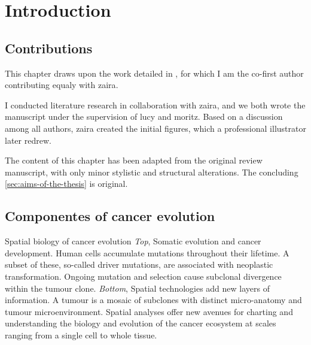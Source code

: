 \chapter{Introduction}
\label{sec:chapter-introduction}

\section*{Contributions}

This chapter draws upon the work detailed in , for which I am the co-first author contributing equaly with \ac{zaira}.

I conducted literature research in collaboration with \ac{zaira}, and we both wrote the manuscript under the supervision of \ac{lucy} and \ac{moritz}. Based on a discussion among all authors, \ac{zaira} created the initial figures, which a professional illustrator later redrew.

The content of this chapter has been adapted from the original review manuscript, with only minor stylistic and structural alterations. The concluding \cref{sec:aims-of-the-thesis} is original.

\section{Componentes of cancer evolution}

    {Spatial biology of cancer evolution \parencite{Seferbekova2023-wg}}
    {\emph{Top}, Somatic evolution and cancer development. Human cells accumulate mutations throughout their lifetime. A subset of these, so-called driver mutations, are associated with neoplastic transformation. Ongoing mutation and selection cause subclonal divergence within the tumour clone. \emph{Bottom}, Spatial technologies add new layers of information. A tumour is a mosaic of subclones with distinct micro-anatomy and tumour microenvironment. Spatial analyses offer new avenues for charting and understanding the biology and evolution of the cancer ecosystem at scales ranging from a single cell to whole tissue.}


